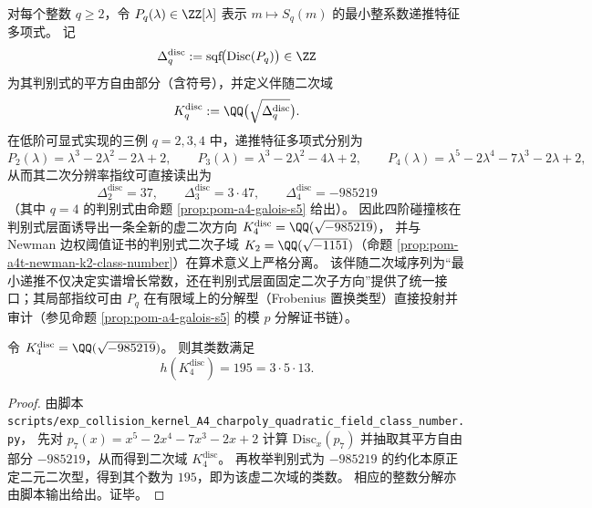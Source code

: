 \begin{remark}\label{rem:pom-discriminant-quadratic-field-tower}
对每个整数 \(q\ge 2\)，令 \(P_q(\lambda)\in\ZZ[\lambda]\) 表示 \(m\mapsto S_q(m)\) 的最小整系数递推特征多项式。
记
\[
\Delta_q^{\mathrm{disc}}:=\mathrm{sqf}\!\bigl(\mathrm{Disc}(P_q)\bigr)\in\ZZ
\]
为其判别式的平方自由部分（含符号），并定义伴随二次域
\[
K_q^{\mathrm{disc}}:=\QQ\bigl(\sqrt{\Delta_q^{\mathrm{disc}}}\bigr).
\]
在低阶可显式实现的三例 \(q=2,3,4\) 中，递推特征多项式分别为
\[
P_2(\lambda)=\lambda^3-2\lambda^2-2\lambda+2,\qquad
P_3(\lambda)=\lambda^3-2\lambda^2-4\lambda+2,\qquad
P_4(\lambda)=\lambda^5-2\lambda^4-7\lambda^3-2\lambda+2,
\]
从而其二次分辨率指纹可直接读出为
\[
\Delta_2^{\mathrm{disc}}=37,\qquad
\Delta_3^{\mathrm{disc}}=3\cdot 47,\qquad
\Delta_4^{\mathrm{disc}}=-985219
\]
（其中 \(q=4\) 的判别式由命题 \ref{prop:pom-a4-galois-s5} 给出）。
因此四阶碰撞核在判别式层面诱导出一条全新的虚二次方向
\(
K_4^{\mathrm{disc}}=\QQ(\sqrt{-985219})
\)，
并与 Newman 边权阈值证书的判别式二次子域 \(K_2=\QQ(\sqrt{-1151})\)（命题 \ref{prop:pom-a4t-newman-k2-class-number}）在算术意义上严格分离。
该伴随二次域序列为“最小递推不仅决定实谱增长常数，还在判别式层面固定二次子方向”提供了统一接口；其局部指纹可由 \(P_q\) 在有限域上的分解型（Frobenius 置换类型）直接投射并审计（参见命题 \ref{prop:pom-a4-galois-s5} 的模 \(p\) 分解证书链）。
\end{remark}

\begin{proposition}[\texorpdfstring{$K_4^{\mathrm{disc}}=\QQ(\sqrt{-985219})$}{K4disc} 的类数证书：\(h=195\)]\label{prop:pom-a4-disc-quadratic-class-number}
令 \(K_4^{\mathrm{disc}}=\QQ(\sqrt{-985219})\)。
则其类数满足
\[
h(K_4^{\mathrm{disc}})=195=3\cdot 5\cdot 13.
\]
\end{proposition}
\begin{proof}
由脚本 \texttt{scripts/exp\_collision\_kernel\_A4\_charpoly\_quadratic\_field\_class\_number.py}，
先对 \(p_7(x)=x^5-2x^4-7x^3-2x+2\) 计算 \(\mathrm{Disc}_x(p_7)\) 并抽取其平方自由部分 \(-985219\)，从而得到二次域 \(K_4^{\mathrm{disc}}\)。
再枚举判别式为 \(-985219\) 的约化本原正定二元二次型，得到其个数为 \(195\)，即为该虚二次域的类数。
相应的整数分解亦由脚本输出给出。证毕。
\end{proof}


